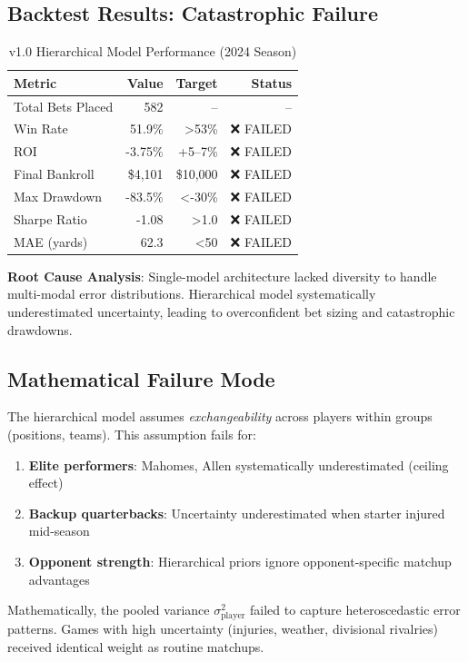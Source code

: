 \subsection{Backtest Results: Catastrophic Failure}

\begin{table}[h]
\centering
\caption{v1.0 Hierarchical Model Performance (2024 Season)}
\label{tab:v1-performance}
\begin{tabular}{lrrr}
\toprule
\textbf{Metric} & \textbf{Value} & \textbf{Target} & \textbf{Status} \\
\midrule
Total Bets Placed & 582 & -- & -- \\
Win Rate & 51.9\% & >53\% & ❌ FAILED \\
ROI & -3.75\% & +5--7\% & ❌ FAILED \\
Final Bankroll & \$4,101 & \$10,000 & ❌ FAILED \\
Max Drawdown & -83.5\% & <-30\% & ❌ FAILED \\
Sharpe Ratio & -1.08 & >1.0 & ❌ FAILED \\
MAE (yards) & 62.3 & <50 & ❌ FAILED \\
\bottomrule
\end{tabular}
\end{table}

\textbf{Root Cause Analysis}: Single-model architecture lacked diversity to handle multi-modal error distributions. Hierarchical model systematically underestimated uncertainty, leading to overconfident bet sizing and catastrophic drawdowns.

\subsection{Mathematical Failure Mode}

The hierarchical model assumes \textit{exchangeability} across players within groups (positions, teams). This assumption fails for:

\begin{enumerate}
\item \textbf{Elite performers}: Mahomes, Allen systematically underestimated (ceiling effect)
\item \textbf{Backup quarterbacks}: Uncertainty underestimated when starter injured mid-season
\item \textbf{Opponent strength}: Hierarchical priors ignore opponent-specific matchup advantages
\end{enumerate}

Mathematically, the pooled variance $\sigma^2_{\text{player}}$ failed to capture heteroscedastic error patterns. Games with high uncertainty (injuries, weather, divisional rivalries) received identical weight as routine matchups.

